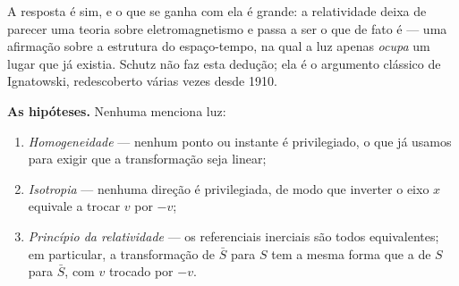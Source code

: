 \documentclass[12pt,a4paper,oneside]{book}
\theoremstyle{rgplain}
\theoremstyle{rgremark}
\begin{document}
A resposta é sim, e o que se ganha com ela é grande: a relatividade deixa de
parecer uma teoria sobre eletromagnetismo e passa a ser o que de fato é --- uma
afirmação sobre a estrutura do espaço-tempo, na qual a luz apenas
\emph{ocupa} um lugar que já existia. Schutz não faz esta dedução; ela é o
argumento clássico de Ignatowski, redescoberto várias vezes desde 1910.

\textbf{As hipóteses.} Nenhuma menciona luz:
\begin{enumerate}
  \item \emph{Homogeneidade} --- nenhum ponto ou instante é privilegiado, o
  que já usamos para exigir que a transformação seja linear;
  \item \emph{Isotropia} --- nenhuma direção é privilegiada, de modo que
  inverter o eixo $x$ equivale a trocar $v$ por $-v$;
  \item \emph{Princípio da relatividade} --- os referenciais inerciais são
  todos equivalentes; em particular, a transformação de $\bar S$ para $S$ tem a
  mesma forma que a de $S$ para $\bar S$, com $v$ trocado por $-v$.
\end{enumerate}
\end{document}
